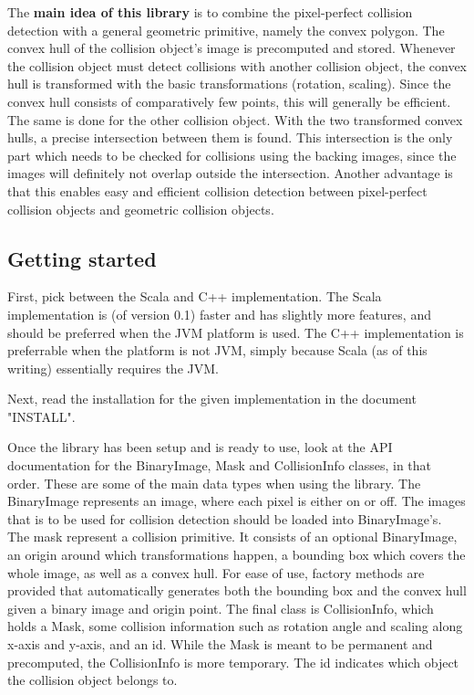 The \textbf{main idea of this library} is to combine the pixel-perfect collision detection
with a general geometric primitive, namely the convex polygon.
The convex hull of the collision object's image is precomputed and stored.
Whenever the collision object must detect collisions with another collision object,
the convex hull is transformed with the basic transformations (rotation, scaling).
Since the convex hull consists of comparatively few points, this will generally
be efficient. The same is done for the other collision object.
With the two transformed convex hulls, a precise intersection between them is found.
This intersection is the only part which needs to be checked for collisions using
the backing images, since the images will definitely not overlap outside
the intersection.
Another advantage is that this enables easy and efficient collision detection
between pixel-perfect collision objects and geometric collision objects.

\subsection{Getting started}

First, pick between the Scala and C++ implementation.
The Scala implementation is (of version 0.1) faster and
has slightly more features, and should be preferred when the JVM
platform is used. The C++ implementation is preferrable when
the platform is not JVM, simply because Scala (as of this writing)
essentially requires the JVM.

Next, read the installation for the given implementation
in the document "INSTALL".

Once the library has been setup and is ready to use,
look at the API documentation for the BinaryImage,
Mask and CollisionInfo classes, in that order.
These are some of the main data types when using the library.
The BinaryImage represents an image, where each pixel
is either on or off. The images that is to be used for
collision detection should be loaded into BinaryImage's.
The mask represent a collision primitive.
It consists of an optional BinaryImage, an origin
around which transformations happen,
a bounding box which covers the whole image,
as well as a convex hull.
For ease of use, factory methods are provided
that automatically generates both the bounding
box and the convex hull given a binary image
and origin point.
The final class is CollisionInfo, which
holds a Mask, some collision information
such as rotation angle and scaling along
x-axis and y-axis, and an id.
While the Mask is meant to be permanent and precomputed,
the CollisionInfo is more temporary.
The id indicates which object the collision object
belongs to.

